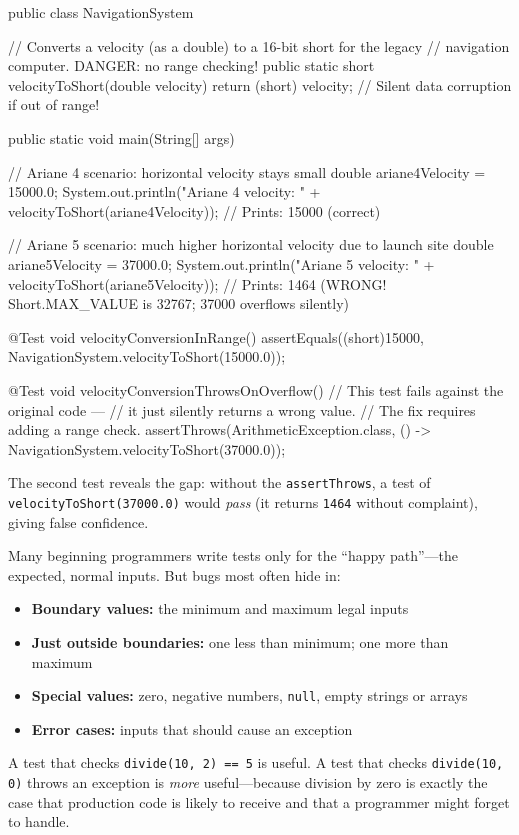 \documentclass[11pt,letterpaper]{article}
\begin{document}
\begin{bugcode}
public class NavigationSystem {

    // Converts a velocity (as a double) to a 16-bit short for the legacy
    // navigation computer. DANGER: no range checking!
    public static short velocityToShort(double velocity) {
        return (short) velocity;  // Silent data corruption if out of range!
    }

    public static void main(String[] args) {
        // Ariane 4 scenario: horizontal velocity stays small
        double ariane4Velocity = 15000.0;
        System.out.println("Ariane 4 velocity: " + velocityToShort(ariane4Velocity));
        // Prints: 15000  (correct)

        // Ariane 5 scenario: much higher horizontal velocity due to launch site
        double ariane5Velocity = 37000.0;
        System.out.println("Ariane 5 velocity: " + velocityToShort(ariane5Velocity));
        // Prints: 1464  (WRONG! Short.MAX_VALUE is 32767; 37000 overflows silently)
    }
}
\end{bugcode}

\begin{javacode}
@Test
void velocityConversionInRange() {
    assertEquals((short)15000, NavigationSystem.velocityToShort(15000.0));
}

@Test
void velocityConversionThrowsOnOverflow() {
    // This test fails against the original code ---
    // it just silently returns a wrong value.
    // The fix requires adding a range check.
    assertThrows(ArithmeticException.class,
                 () -> NavigationSystem.velocityToShort(37000.0));
}
\end{javacode}

The second test reveals the gap: without the \texttt{assertThrows}, a test of \texttt{velocityToShort(37000.0)} would \textit{pass} (it returns \texttt{1464} without complaint), giving false confidence.

\begin{tipbox}
Many beginning programmers write tests only for the ``happy path''---the expected, normal inputs. But bugs most often hide in:
\begin{itemize}[itemsep=2pt]
    \item \textbf{Boundary values:} the minimum and maximum legal inputs
    \item \textbf{Just outside boundaries:} one less than minimum; one more than maximum
    \item \textbf{Special values:} zero, negative numbers, \texttt{null}, empty strings or arrays
    \item \textbf{Error cases:} inputs that should cause an exception
\end{itemize}
A test that checks \texttt{divide(10, 2) == 5} is useful. A test that checks \texttt{divide(10, 0)} throws an exception is \textit{more} useful---because division by zero is exactly the case that production code is likely to receive and that a programmer might forget to handle.
\end{tipbox}
\end{document}
